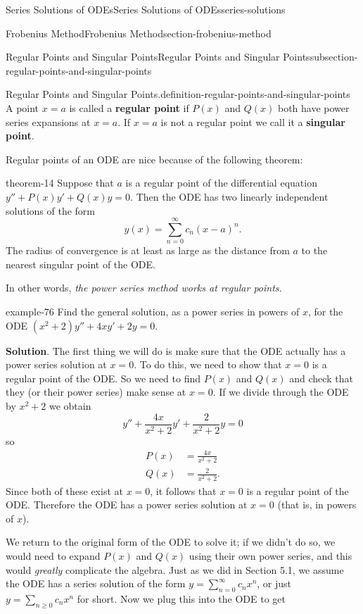 \documentclass[oneside,10pt,]{book}
\newcommand{\terminology}[1]{\textbf{#1}}
\numberwithin{equation}{section}
\newcommand{\amp}{&}
\begin{document}
\begin{chapterptx}{Series Solutions of ODEs}{}{Series Solutions of ODEs}{}{}{series-solutions}
\begin{sectionptx}{Frobenius Method}{}{Frobenius Method}{}{}{section-frobenius-method}
\begin{subsectionptx}{Regular Points and Singular Points}{}{Regular Points and Singular Points}{}{}{subsection-regular-points-and-singular-points}
\begin{definition}{Regular Points and Singular Points.}{definition-regular-points-and-singular-points}
\hypertarget{p-460}{}%
A point \(x=a\) is called a \terminology{regular point} if \(P(x)\) and \(Q(x)\) both have power series expansions at \(x=a\). If \(x=a\) is not a regular point we call it a \terminology{singular point}.%
\end{definition}
\hypertarget{p-461}{}%
Regular points of an ODE are nice because of the following theorem:%
\begin{theorem}{}{}{theorem-14}%
\hypertarget{p-462}{}%
Suppose that \(a\) is a regular point of the differential equation \(y''+P(x)y'+Q(x)y=0\). Then the ODE has two linearly independent solutions of the form%
\begin{equation*}
y(x) = \sum_{n=0}^{\infty}c_{n}(x-a)^{n}.
\end{equation*}
The radius of convergence is at least as large as the distance from \(a\) to the nearest singular point of the ODE.%
\end{theorem}
\hypertarget{p-463}{}%
In other words, \emph{the power series method works at regular points.}%
\begin{example}{}{example-76}%
\hypertarget{p-464}{}%
Find the general solution, as a power series in powers of \(x\), for the ODE \((x^{2}+2)y''+4xy'+2y=0\).%
\par\smallskip%
\noindent\textbf{Solution}.\hypertarget{solution-73}{}\quad%
\hypertarget{p-465}{}%
The first thing we will do is make sure that the ODE actually has a power series solution at \(x=0\). To do this, we need to show that \(x=0\) is a regular point of the ODE. So we need to find \(P(x)\) and \(Q(x)\) and check that they (or their power series) make sense at \(x=0\). If we divide through the ODE by \(x^{2}+2\) we obtain%
\begin{equation*}
y''+\frac{4x}{x^{2}+2}y'+\frac{2}{x^{2}+2}y = 0
\end{equation*}
so%
\begin{align*}
P(x) \amp= \frac{4x}{x^{2}+2}\\
Q(x) \amp= \frac{2}{x^{2}+2}\text{.}
\end{align*}
Since both of these exist at \(x=0\), it follows that \(x=0\) is a regular point of the ODE. Therefore the ODE has a power series solution at \(x=0\) (that is, in powers of \(x\)).%
\par
\hypertarget{p-466}{}%
We return to the original form of the ODE to solve it; if we didn't do so, we would need to expand \(P(x)\) and \(Q(x)\) using their own power series, and this would \emph{greatly} complicate the algebra. Just as we did in Section 5.1, we assume the ODE has a series solution of the form \(y = \sum_{n=0}^{\infty}c_{n}x^{n}\), or just \(y=\sum_{n\geq0}c_{n}x^{n}\) for short. Now we plug this into the ODE to get%

\end{example}
\end{subsectionptx}
\end{sectionptx}
\end{chapterptx}
\end{document}
